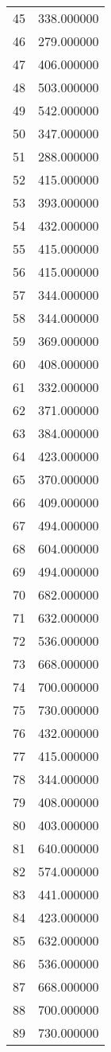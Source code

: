 \documentclass[12pt]{article}
\begin{document}
\begin{longtable}{@{}cc@{}}
45 & 338.000000 \\
46 & 279.000000 \\
47 & 406.000000 \\
48 & 503.000000 \\
49 & 542.000000 \\
50 & 347.000000 \\
51 & 288.000000 \\
52 & 415.000000 \\
53 & 393.000000 \\
54 & 432.000000 \\
55 & 415.000000 \\
56 & 415.000000 \\
57 & 344.000000 \\
58 & 344.000000 \\
59 & 369.000000 \\
60 & 408.000000 \\
61 & 332.000000 \\
62 & 371.000000 \\
63 & 384.000000 \\
64 & 423.000000 \\
65 & 370.000000 \\
66 & 409.000000 \\
67 & 494.000000 \\
68 & 604.000000 \\
69 & 494.000000 \\
70 & 682.000000 \\
71 & 632.000000 \\
72 & 536.000000 \\
73 & 668.000000 \\
74 & 700.000000 \\
75 & 730.000000 \\
76 & 432.000000 \\
77 & 415.000000 \\
78 & 344.000000 \\
79 & 408.000000 \\
80 & 403.000000 \\
81 & 640.000000 \\
82 & 574.000000 \\
83 & 441.000000 \\
84 & 423.000000 \\
85 & 632.000000 \\
86 & 536.000000 \\
87 & 668.000000 \\
88 & 700.000000 \\
89 & 730.000000 \\

\end{longtable}
\end{document}
